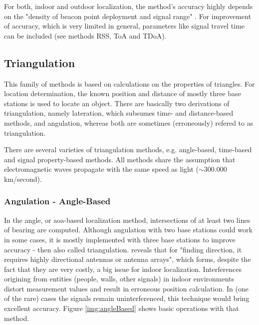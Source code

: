 For both, indoor and outdoor localization, the method's accuracy highly depends on the "density of beacon point deployment and signal range" \cite[p. 3]{wirelessILSystemsAndTechniques}. For improvement of accuracy, which is very limited in general, parameters like signal travel time can be included (see methods RSS, ToA and TDoA).

\subsection{Triangulation}

This family of methods is based on calculations on the properties of triangles. For location determination, the known position and distance of mostly three base stations is used to locate an object. There are basically two derivations of triangulation, namely lateration, which subsumes time- and distance-based methods, and angulation, whereas both are sometimes (erroneously) refered to as triangulation.

There are several varieties of triangulation methods, e.g. angle-based, time-based and signal property-based methods\cite{recentAdvances}. All methods share the assumption that electromagnetic waves propagate with the same speed as light ($\sim$300.000 km/second).\\

\subsubsection{Angulation - Angle-Based} 
In the angle, or \ac{aoa}-based localization method, intersections of at least two lines of bearing are computed. Although angulation with two base stations could work in some cases, it is mostly implemented with three base stations to improve accuracy - then also called triangulation. \cite{recentAdvances} reveals that for "finding direction, it requires highly directional antennas or antenna arrays", which forms, despite the fact that they are very costly, a big issue for indoor localization. Interferences origining from entities (people, walls, other signals) in indoor environments distort measurement values and result in erroneous position calculation. In (one of the rare) cases the signals remain uninterferenced, this technique would bring excellent accuracy.
Figure \ref{img:angleBased} shows basic operations with that method.

